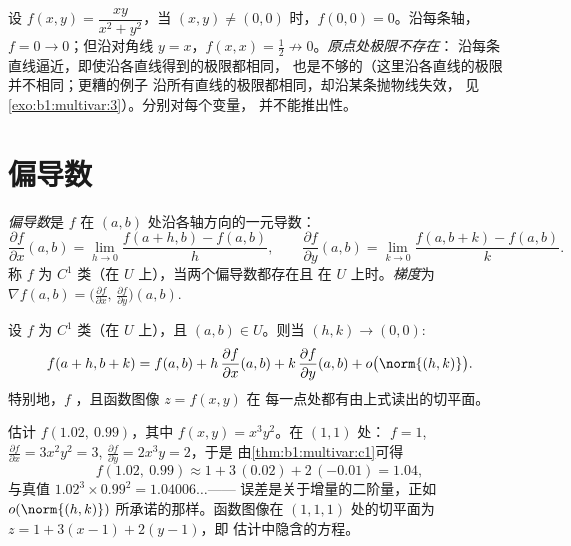 \begin{example}[径向陷阱]\label{ex:b1:multivar:trap}
设 $f(x, y) = \dfrac{xy}{x^2 + y^2}$，当 $(x,y) \neq (0,0)$ 时，$f(0,
0) = 0$。沿每条轴，$f = 0 \to 0$；但沿对角线 $y
= x$，$f(x, x) = \frac12 \not\to 0$。\emph{原点处极限不存在}：
沿每条直线逼近，即使沿各直线得到的极限都相同，
也是不够的（这里沿各直线的极限并不相同；更糟的例子
沿所有直线的极限都相同，却沿某条抛物线失效，
见\cref{exo:b1:multivar:3}）。分别对每个变量，
并不能推出性。
\end{example}

\section{偏导数}

\begin{definition}\label{def:b1:multivar:partial}
\emph{偏导数}是 $f$ 在
$(a, b)$ 处沿各轴方向的一元导数：
\[
\frac{\partial f}{\partial x}(a,b)
= \lim_{h \to 0} \frac{f(a + h, b) - f(a,b)}{h},
\qquad
\frac{\partial f}{\partial y}(a,b)
= \lim_{k \to 0} \frac{f(a, b + k) - f(a,b)}{k}.
\]
称 $f$ 为 $C^1$ 类（在 $U$ 上），当两个偏导数都存在且
在 $U$ 上时。\emph{梯度}为 $\nabla f(a,b) =
\bigl(\frac{\partial f}{\partial x},\, \frac{\partial f}{\partial
y}\bigr)(a,b)$.
\end{definition}

\begin{theorem}[$C^1$ 蕴含切平面]\label{thm:b1:multivar:c1}
设 $f$ 为 $C^1$ 类（在 $U$ 上），且 $(a,b) \in U$。则当 $(h, k) \to
(0,0)$:
\[
f(a + h, b + k) = f(a, b)
+ h\,\frac{\partial f}{\partial x}(a,b)
+ k\,\frac{\partial f}{\partial y}(a,b)
+ o\bigl(\norm{(h,k)}\bigr) .
\]
特别地，$f$ ，且函数图像 $z = f(x,y)$ 在
每一点处都有由上式读出的切平面。
\end{theorem}

\begin{example}[线性逼近的应用]
\label{ex:b1:multivar:linapprox}
估计 $f(1.02,\ 0.99)$，其中 $f(x, y) = x^3y^2$。在 $(1, 1)$ 处：
$f = 1$, $\frac{\partial f}{\partial x} = 3x^2y^2 = 3$,
$\frac{\partial f}{\partial y} = 2x^3y = 2$，于是
由\cref{thm:b1:multivar:c1}可得
\[
f(1.02,\ 0.99) \approx 1 + 3\,(0.02) + 2\,(-0.01) = 1.04 ,
\]
与真值 $1.02^3 \times 0.99^2 = 1.04006\dots$——
误差是关于增量的二阶量，正如
$o(\norm{(h,k)})$ 所承诺的那样。函数图像在
$(1, 1, 1)$ 处的切平面为 $z = 1 + 3(x - 1) + 2(y - 1)$，即
估计中隐含的方程。
\end{example}

